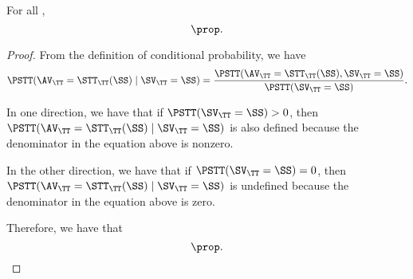 \begin{proposition}
  For all \rchreqarng,
  $$\prop.$$%
\end{proposition}

\begin{proof}
  From the definition of conditional probability, we have
  $$ 
  \PSTT(\AV_\TT = \STT_\TT(\SS) \mid \SV_\TT = \SS)
  = 
  \frac
  {\PSTT(\AV_\TT = \STT_\TT(\SS), \SV_\TT = \SS)}
  {\PSTT(\SV_\TT = \SS)}.$$

  In one direction, we have that if $\PSTT(\SV_\TT = \SS) > 0$, then 
  $ \PSTT(\AV_\TT = \STT_\TT(\SS) \mid \SV_\TT = \SS) $
  is also defined because the denominator in the equation above is nonzero.

  In the other direction, we have that if $\PSTT(\SV_\TT = \SS) = 0$, then 
  $ \PSTT(\AV_\TT = \STT_\TT(\SS) \mid \SV_\TT = \SS) $
  is undefined because the denominator in the equation above is zero.

  Therefore, we have that
  $$\prop.$$%
\end{proof}
